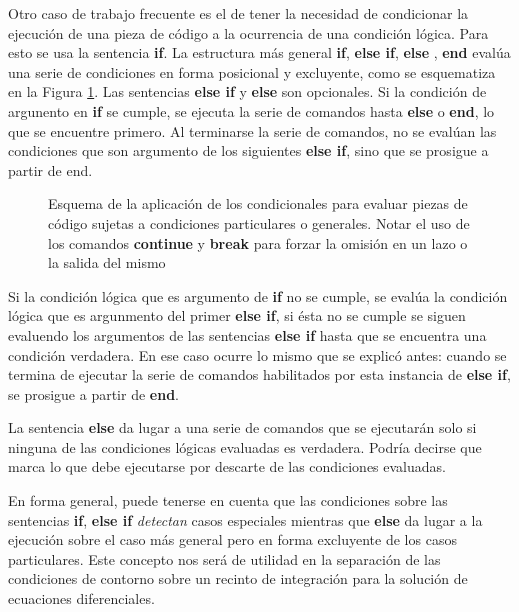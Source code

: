 
Otro caso de trabajo frecuente es el de tener 
la necesidad de condicionar la ejecución de 
una pieza de código a la ocurrencia de una 
condición lógica. Para esto se usa la sentencia
\textbf{if}. La estructura más general \textbf{if},
\textbf{else if}, \textbf{else} , \textbf{end} evalúa
una serie de condiciones en forma posicional  y 
excluyente, como se esquematiza en la Figura 
\ref{FigMatlabIf}. Las sentencias \textbf{else if} y 
\textbf{else} son opcionales. Si la condición 
de argunento en \textbf{if} se cumple, se ejecuta
la serie de comandos hasta \textbf{else} o 
\textbf{end}, lo que se encuentre primero. Al 
terminarse la serie de comandos, no se evalúan 
las condiciones que son argumento de los 
siguientes \textbf{else if}, sino que se
prosigue a partir de end. 

\begin{figure}
  
  \caption{Esquema de la aplicación de los condicionales   para 
  evaluar piezas de código sujetas a condiciones 
  particulares o generales. Notar el uso de los comandos 
  \protect\textbf{continue} y \protect\textbf{break} para forzar la 
  omisión en un lazo o la salida del mismo
  \label{FigMatlabIf}
  }

\end{figure}

Si la condición lógica que es argumento de \textbf{if}
no se cumple, se evalúa 
la condición lógica que es argunmento del 
primer \textbf{else if}, si ésta no se cumple 
se siguen evaluendo los argumentos de las
sentencias \textbf{else if} hasta que se encuentra 
una condición verdadera. En ese caso ocurre lo 
mismo que se explicó antes: cuando se termina
de ejecutar la serie de comandos habilitados
por esta instancia de \textbf{else if}, se
prosigue a partir de \textbf{end}.

La sentencia \textbf{else} da lugar a una serie de
comandos que se ejecutarán solo si ninguna de las 
condiciones lógicas evaluadas es verdadera. 
Podría decirse que marca lo que debe ejecutarse por 
descarte de las condiciones evaluadas. 

En forma general, puede tenerse en cuenta que las 
condiciones sobre las sentencias \textbf{if}, 
\textbf{else if} \emph{ detectan} casos especiales
mientras que \textbf{else} da lugar a la ejecución
sobre el caso más general pero en forma 
excluyente de los casos particulares. Este 
concepto nos será de utilidad en la separación
de las condiciones de contorno sobre un 
recinto de integración para la solución
de ecuaciones diferenciales. 

\mode*
